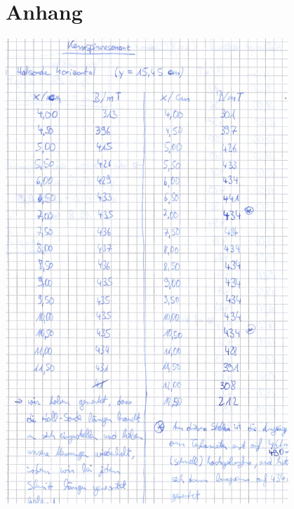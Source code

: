 \clearpage
\section{Anhang}
\begin{appendix}

\centering \includegraphics[width = 0.8\textwidth]{appendix/scan0001.jpg}

\end{appendix}
